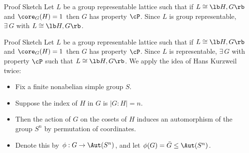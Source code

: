 \begin{frame}[label=IEPropsLemma2]{}
\alert{Proof Sketch}
\vskip2mm
  Let $L$ be a group representable lattice such that if $L\cong \lb H,G \rb$ and
  $\core_G(H)=1$ then $G$ has property $\cP$.  
\vskip4mm
  Since $L$ is group representable, $\exists\, G$ with $L
  \cong \lb H,G \rb$.
\vskip4mm
\end{frame}

\begin{frame}[label=IEPropsLemma2Alt]{}
\alert{Proof Sketch}
\vskip2mm
  Let $L$ be a group representable lattice such that if $L\cong \lb H,G \rb$ and
  $\core_G(H)=1$ then $G$ has property $\cP$.  
\vskip4mm
  Since $L$ is representable, $\exists\, G$ with property $\cP$ such that $L
  \cong \lb H,G \rb$. 
\vskip4mm
  We apply the idea of Hans Kurzweil twice:
  \begin{itemize}
  \item Fix a finite nonabelian simple group $S$. 
\vskip2mm
\item Suppose the index of $H$ in $G$ is $|G:H| = n$.
\vskip2mm
\item Then the action of $G$ on the cosets of $H$ induces an automorphism of the
group $S^n$ by permutation of coordinates.  
\vskip2mm
\item
Denote this by  $\phi: G \rightarrow \Aut(S^n)$, 
  and let $\phi(G) = \bar{G} \leq \Aut(S^n)$.  
  \end{itemize}
\end{frame}


